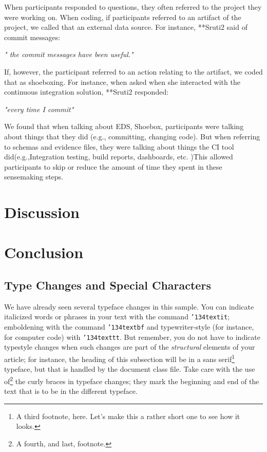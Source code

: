 \documentclass{sig-alternate-05-2015}
\begin{document}
When participants responded to questions, they often referred to the project they were working on. When coding, if participants referred to an artifact of the project, we called that an external data source. For instance, **Sruti2 said of commit messages: 

\textit{" the commit messages have been  useful."}

If, however, the participant referred to an action relating to the artifact, we coded that as shoeboxing. For instance, when asked when she interacted with the continuous integration solution, **Sruti2 responded: 

\textit{"every time I commit"}

We found that when talking about EDS, Shoebox, participants were talking about things that they did (e.g., committing, changing code). But when referring to schemas and evidence files, they were talking about things the CI tool did(e.g.,Integration testing, build reports, dashboards, etc.
)This allowed participants to skip or reduce the amount of time they spent in these sensemaking steps. 

\section{Discussion}
\section{Conclusion}

\subsection{Type Changes and {\subsecit Special} Characters}
We have already seen several typeface changes in this sample.  You
can indicate italicized words or phrases in your text with
the command \texttt{{\char'134}textit}; emboldening with the
command \texttt{{\char'134}textbf}
and typewriter-style (for instance, for computer code) with
\texttt{{\char'134}texttt}.  But remember, you do not
have to indicate typestyle changes when such changes are
part of the \textit{structural} elements of your
article; for instance, the heading of this subsection will
be in a sans serif\footnote{A third footnote, here.
Let's make this a rather short one to
see how it looks.} typeface, but that is handled by the
document class file. Take care with the use
of\footnote{A fourth, and last, footnote.}
the curly braces in typeface changes; they mark
the beginning and end of
the text that is to be in the different typeface.
\end{document}
